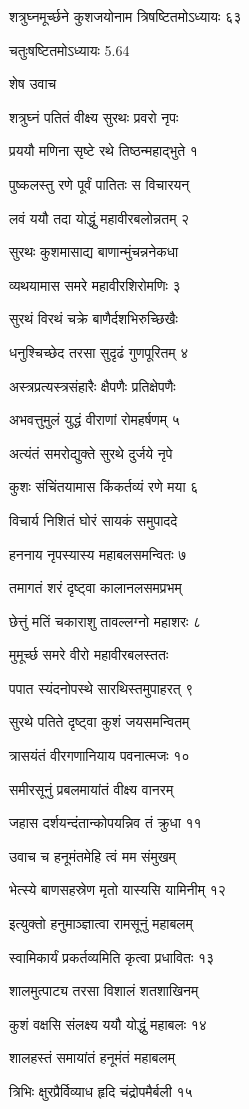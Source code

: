 शत्रुघ्नमूर्च्छने कुशजयोनाम त्रिषष्टितमोऽध्यायः ६३

चतुःषष्टितमोऽध्यायः 5.64

शेष उवाच

शत्रुघ्नं पतितं वीक्ष्य सुरथः प्रवरो नृपः

प्रययौ मणिना सृष्टे रथे तिष्ठन्महाद्भुते १

पुष्कलस्तु रणे पूर्वं पातितः स विचारयन्

लवं ययौ तदा योद्धुं महावीरबलोन्नतम् २

सुरथः कुशमासाद्य बाणान्मुंचन्ननेकधा

व्यथयामास समरे महावीरशिरोमणिः ३

सुरथं विरथं चक्रे बाणैर्दशभिरुच्छिखैः

धनुश्चिच्छेद तरसा सुदृढं गुणपूरितम् ४

अस्त्रप्रत्यस्त्रसंहारैः क्षैपणैः प्रतिक्षेपणैः

अभवत्तुमुलं युद्धं वीराणां रोमहर्षणम् ५

अत्यंतं समरोद्युक्ते सुरथे दुर्जये नृपे

कुशः संचिंतयामास किंकर्तव्यं रणे मया ६

विचार्य निशितं घोरं सायकं समुपाददे

हननाय नृपस्यास्य महाबलसमन्वितः ७

तमागतं शरं दृष्ट्वा कालानलसमप्रभम्

छेत्तुं मतिं चकाराशु तावल्लग्नो महाशरः ८

मुमूर्च्छ समरे वीरो महावीरबलस्ततः

पपात स्यंदनोपस्थे सारथिस्तमुपाहरत् ९

सुरथे पतिते दृष्ट्वा कुशं जयसमन्वितम्

त्रासयंतं वीरगणानियाय पवनात्मजः १०

समीरसूनुं प्रबलमायांतं वीक्ष्य वानरम्

जहास दर्शयन्दंतान्कोपयन्निव तं क्रुधा ११

उवाच च हनूमंतमेहि त्वं मम संमुखम्

भेत्स्ये बाणसहस्रेण मृतो यास्यसि यामिनीम् १२

इत्युक्तो हनुमाञ्ज्ञात्वा रामसूनुं महाबलम्

स्वामिकार्यं प्रकर्तव्यमिति कृत्वा प्रधावितः १३

शालमुत्पाट्य तरसा विशालं शतशाखिनम्

कुशं वक्षसि संलक्ष्य ययौ योद्धुं महाबलः १४

शालहस्तं समायांतं हनूमंतं महाबलम्

त्रिभिः क्षुरप्रैर्विव्याध हृदि चंद्रोपमैर्बली १५

